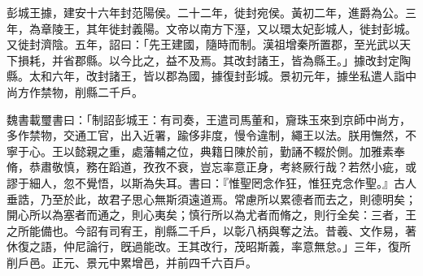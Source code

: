 
\begin{pinyinscope}
彭城王據，建安十六年封范陽侯。二十二年，徙封宛侯。黃初二年，進爵為公。三年，為章陵王，其年徙封義陽。文帝以南方下溼，又以環太妃彭城人，徙封彭城。又徙封濟陰。五年，詔曰：「先王建國，隨時而制。漢祖增秦所置郡，至光武以天下損耗，并省郡縣。以今比之，益不及焉。其改封諸王，皆為縣王。」據改封定陶縣。太和六年，改封諸王，皆以郡為國，據復封彭城。景初元年，據坐私遣人詣中尚方作禁物，削縣二千戶。

魏書載璽書曰：「制詔彭城王：有司奏，王遣司馬董和，齎珠玉來到京師中尚方，多作禁物，交通工官，出入近署，踰侈非度，慢令違制，繩王以法。朕用憮然，不寧于心。王以懿親之重，處藩輔之位，典籍日陳於前，勤誦不輟於側。加雅素奉脩，恭肅敬慎，務在蹈道，孜孜不衰，豈忘率意正身，考終厥行哉？若然小疵，或謬于細人，忽不覺悟，以斯為失耳。書曰：『惟聖罔念作狂，惟狂克念作聖。』古人垂誥，乃至於此，故君子思心無斯須遠道焉。常慮所以累德者而去之，則德明矣；開心所以為塞者而通之，則心夷矣；慎行所以為尤者而脩之，則行全矣：三者，王之所能備也。今詔有司宥王，削縣二千戶，以彰八柄與奪之法。昔羲、文作易，著休復之語，仲尼論行，旣過能改。王其改行，茂昭斯義，率意無怠。」三年，復所削戶邑。正元、景元中累增邑，并前四千六百戶。


\end{pinyinscope}